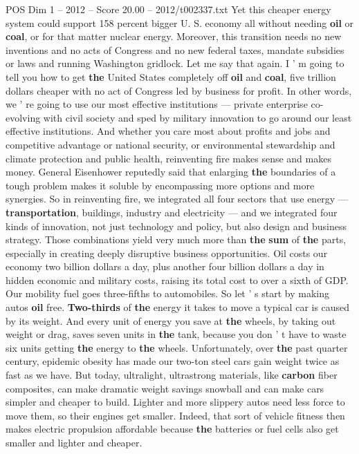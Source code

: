 \begin{textsample}{POS Dim 1 – 2012 – Score 20.00 – 2012/t002337.txt}
Yet this cheaper energy system could support 158 percent bigger U.
S. economy all without needing \textbf{oil} or \textbf{coal}, or for that matter nuclear energy.
Moreover, this transition needs no new inventions and no acts of Congress and no new federal taxes, mandate subsidies or laws and running Washington gridlock.
Let me say that again.
I ' m going to tell you how to get \textbf{the} United States completely off \textbf{oil} and \textbf{coal}, five trillion dollars cheaper with no act of Congress led by business for profit.
In other words, we ' re going to use our most effective institutions — private enterprise co-evolving with civil society and sped by military innovation to go around our least effective institutions.
And whether you care most about profits and jobs and competitive advantage or national security, or environmental stewardship and climate protection and public health, reinventing fire makes sense and makes money.
General Eisenhower reputedly said that enlarging \textbf{the} boundaries of a tough problem makes it soluble by encompassing more options and more synergies.
So in reinventing fire, we integrated all four sectors that use energy — \textbf{transportation}, buildings, industry and electricity — and we integrated four kinds of innovation, not just technology and policy, but also design and business strategy.
Those combinations yield very much more than \textbf{the} \textbf{sum} of \textbf{the} parts, especially in creating deeply disruptive business opportunities.
Oil costs our economy two billion dollars a day, plus another four billion dollars a day in hidden economic and military costs, raising its total cost to over a sixth of GDP.
Our mobility fuel goes three-fifths to automobiles.
So let ' s start by making autos \textbf{oil} free. \textbf{Two-thirds} of \textbf{the} energy it takes to move a typical car is caused by its weight.
And every unit of energy you save at \textbf{the} wheels, by taking out weight or drag, saves seven units in \textbf{the} tank, because you don ' t have to waste six units getting \textbf{the} energy to \textbf{the} wheels.
Unfortunately, over \textbf{the} past quarter century, epidemic obesity has made our two-ton steel cars gain weight twice as fast as we have.
But today, ultralight, ultrastrong materials, like \textbf{carbon} fiber composites, can make dramatic weight savings snowball and can make cars simpler and cheaper to build.
Lighter and more slippery autos need less force to move them, so their engines get smaller.
Indeed, that sort of vehicle fitness then makes electric propulsion affordable because \textbf{the} batteries or fuel cells also get smaller and lighter and cheaper.

\end{textsample}

